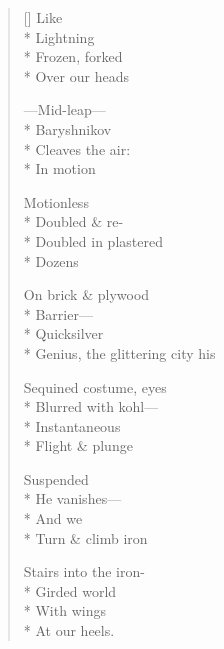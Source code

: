 \label{ch:appearance}
\begin{verse}[\versewidth]
\hspace*{4\vgap} Like\\*
\hspace*{3\vgap} Lightning\\*
Frozen, forked\\*
\hspace*{4\vgap} Over our heads

---Mid-leap---\\*
\hspace*{3\vgap} Baryshnikov\\*
\hspace*{4\vgap} Cleaves the air:\\*
\hspace*{1\vgap} In motion

Motionless\\*
Doubled \& re-\\*
Doubled in plastered\\*
Dozens

On brick \& plywood\\*
Barrier---\\*
\hspace*{4\vgap} Quicksilver\\*
\hspace*{3\vgap} Genius, the glittering city his

Sequined costume, eyes\\*
\hspace*{2\vgap} Blurred with kohl---\\*
\hspace*{3\vgap} Instantaneous\\*
Flight \& plunge

\hspace*{3\vgap} Suspended\\*
He vanishes---\\*
\hspace*{4\vgap} And we\\*
Turn \& climb iron

Stairs into the iron-\\*
Girded world\\*
With wings\\*
At our heels.
\end{verse}
